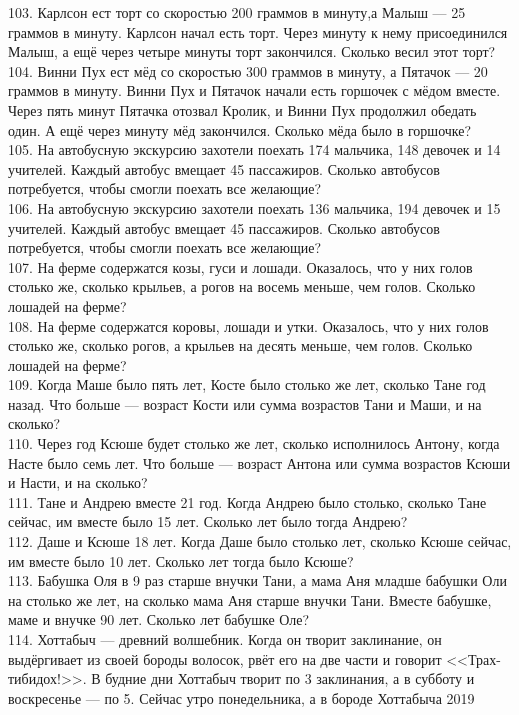 103. Карлсон ест торт со скоростью 200 граммов в минуту,а Малыш --- 25 граммов в минуту. Карлсон начал есть торт. Через минуту к нему присоединился Малыш, а ещё через четыре минуты торт закончился. Сколько весил этот торт?\\
104. Винни Пух ест мёд со скоростью 300 граммов в минуту, а Пятачок --- 20 граммов в минуту. Винни Пух и Пятачок начали есть горшочек с мёдом вместе. Через пять минут Пятачка отозвал Кролик, и Винни Пух продолжил обедать один. А ещё через минуту мёд закончился. Сколько мёда было в горшочке?\\
105. На автобусную экскурсию захотели поехать 174 мальчика, 148 девочек и 14 учителей. Каждый автобус вмещает 45 пассажиров. Сколько автобусов потребуется, чтобы смогли поехать все желающие?\\
106. На автобусную экскурсию захотели поехать 136 мальчика, 194 девочек и 15 учителей. Каждый автобус вмещает 45 пассажиров. Сколько автобусов потребуется, чтобы смогли поехать все желающие?\\
107. На ферме содержатся козы, гуси и лошади. Оказалось, что у них голов столько же, сколько крыльев, а рогов на восемь меньше, чем голов. Сколько лошадей на ферме?\\
108. На ферме содержатся коровы, лошади и утки. Оказалось, что у них голов столько же, сколько рогов, а крыльев на десять меньше, чем голов. Сколько лошадей на ферме?\\
109. Когда Маше было пять лет, Косте было столько же лет, сколько Тане год назад. Что больше --- возраст Кости или сумма возрастов Тани и Маши, и на сколько?\\
110. Через год Ксюше будет столько же лет, сколько исполнилось Антону, когда Насте было семь лет. Что больше --- возраст Антона или сумма возрастов Ксюши и Насти, и на сколько?\\
111. Тане и Андрею вместе 21 год. Когда Андрею было столько, сколько Тане сейчас, им вместе было 15 лет. Сколько лет было тогда Андрею?\\
112. Даше и Ксюше 18 лет. Когда Даше было столько лет, сколько Ксюше сейчас, им вместе было 10 лет. Сколько лет тогда было Ксюше?\\
113. Бабушка Оля в 9 раз старше внучки Тани, а мама Аня младше бабушки Оли на столько же лет, на сколько мама Аня старше внучки Тани. Вместе бабушке, маме и внучке 90 лет. Сколько лет бабушке Оле?\\
114. Хоттабыч --- древний волшебник. Когда он творит заклинание, он выдёргивает из своей бороды волосок, рвёт его на две части и говорит <<Трах-тибидох!>>. В будние дни Хоттабыч творит по 3 заклинания, а в субботу и воскресенье --- по 5. Сейчас утро понедельника, а в бороде Хоттабыча 2019
